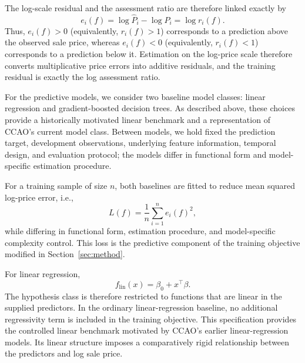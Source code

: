 \documentclass[10pt]{article}
\theoremstyle{definition}
\newcommand{\1}{\mathbf{1}}
\begin{document}
The log-scale residual and the assessment ratio are therefore linked exactly by
\begin{equation}
\label{eq:log_ratio}
e_i(f)
=
\log \widehat{P}_i-\log P_i
=
\log r_i(f).
\end{equation}
Thus, $e_i(f)>0$ (equivalently, $r_i(f)>1$) corresponds to a prediction above the observed sale price, whereas $e_i(f)<0$ (equivalently, $r_i(f)<1$) corresponds to a prediction below it. Estimation on the log-price scale therefore converts multiplicative price errors into additive residuals, and the training residual is exactly the log assessment ratio.

For the predictive models, we consider two baseline model classes: linear regression and gradient-boosted decision trees. As described above, these choices provide a historically motivated linear benchmark and a representation of CCAO's current model class. Between models, we hold fixed the prediction target, development observations, underlying feature information, temporal design, and evaluation protocol; the models differ in functional form and model-specific estimation procedure.

For a training sample of size $n$, both baselines are fitted to reduce mean squared log-price error, i.e.,
\begin{equation}
\label{eq:baseline_learning}
L(f)
=
\frac{1}{n}\sum_{i=1}^n e_i(f)^2,
\end{equation}
while differing in functional form, estimation procedure, and model-specific complexity control. This loss is the predictive component of the training objective modified in Section~\ref{sec:method}.

For linear regression,
\begin{equation}
\label{eq:linear_model}
f_{\mathrm{lin}}(x)
=
\beta_0+x^\top\beta.
\end{equation}
The hypothesis class is therefore restricted to functions that are linear in the supplied predictors. In the ordinary linear-regression baseline, no additional regressivity term is included in the training objective. This specification provides the controlled linear benchmark motivated by CCAO's earlier linear-regression models. Its linear structure imposes a comparatively rigid relationship between the predictors and log sale price.

\end{document}
